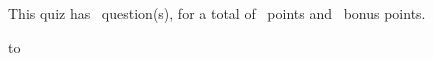 \documentclass[11pt,answers]{exam}
\begin{document}
\extrawidth{-0.3in}
\pagestyle{headandfoot}

\setlength{\hoffset}{-.25in}

\extraheadheight{-.3in}
\runningheadrule
{} 

\begin{center}
	This quiz has \numquestions\ question(s), for a total of \numpoints\
	points and \numbonuspoints\ bonus points.
\end{center}


                 
						

\vspace*{0.1cm}
\hbox to 
\vspace{0.1in}




\end{document}
